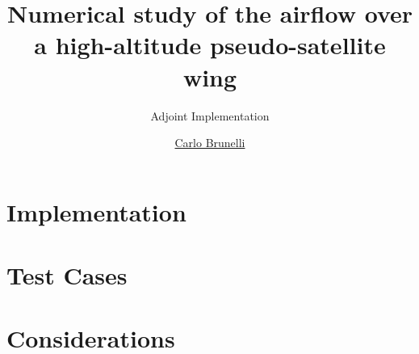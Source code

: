 \documentclass{beamer}
\title{Numerical study of the airflow over a high-altitude pseudo-satellite wing}
\subtitle{Adjoint Implementation}
\author{\href{mailto:mail@carlobrunelli.com}{Carlo Brunelli}}
\begin{document}
\maketitle


\section{Implementation}


\section{Test Cases}


\section{Considerations}

\end{document}
